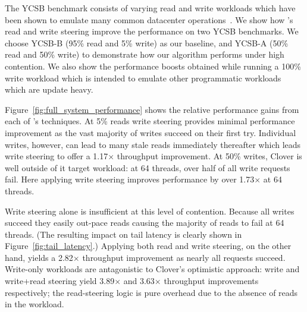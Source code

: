 The YCSB benchmark consists of varying read and write workloads which
have been shown to emulate many common datacenter
operations~\cite{ycsb}. We show how \sword's read and write steering
improve the
performance on two
YCSB benchmarks. We choose YCSB-B (95\% read and 5\% write) as our baseline, and
YCSB-A (50\% read and 50\% write) to demonstrate how our algorithm performs
under high contention.  We also show the performance boosts obtained while
running a 100\% write workload which is intended to emulate other programmatic
workloads which are update heavy.

Figure~\ref{fig:full_system_performance} shows the relative
performance gains from each of \sword's techniques. At 5\% reads write
steering provides minimal performance improvement as the vast majority
of writes succeed on their first try. Individual writes, however, can
lead to many stale reads immediately thereafter which leads write steering
to offer a 1.17$\times$ throughput improvement.
%
%
At 50\% writes, Clover is well outside of it target workload:
at 64 threads, over half of all write requests fail. Here applying write
steering improves performance by over 1.73$\times$ at 64 threads.

Write steering alone is insufficient at this level of contention.
Because all writes succeed they easily out-pace reads causing the
majority of reads to fail at 64 threads.  (The resulting impact on
tail latency is clearly shown in Figure~\ref{fig:tail_latency}.)
Applying both read and write steering, on the other hand, yields a
2.82$\times$ throughput improvement as nearly all requests succeed.
%
%
Write-only workloads are antagonistic to Clover's optimistic
approach: write and write+read steering yield 3.89$\times$ and
3.63$\times$ throughput improvements respectively; the read-steering
logic is pure overhead due to the absence of reads in the
workload.





